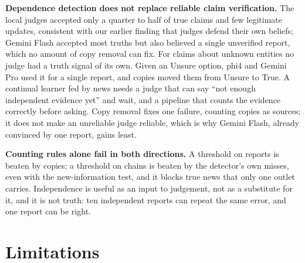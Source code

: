 \textbf{Dependence detection does not replace reliable claim verification.} The local judges accepted only a quarter to half of true claims and few legitimate updates, consistent with our earlier finding that judges defend their own beliefs; Gemini Flash accepted most truths but also believed a single unverified report, which no amount of copy removal can fix. For claims about unknown entities no judge had a truth signal of its own. Given an Unsure option, phi4 and Gemini Pro used it for a single report, and copies moved them from Unsure to True. A continual learner fed by news needs a judge that can say ``not enough independent evidence yet'' and wait, and a pipeline that counts the evidence correctly before asking. Copy removal fixes one failure, counting copies as sources; it does not make an unreliable judge reliable, which is why Gemini Flash, already convinced by one report, gains least.

\textbf{Counting rules alone fail in both directions.} A threshold on reports is beaten by copies; a threshold on chains is beaten by the detector's own misses, even with the new-information test, and it blocks true news that only one outlet carries. Independence is useful as an input to judgement, not as a substitute for it, and it is not truth: ten independent reports can repeat the same error, and one report can be right.

\section{Limitations}\label{sec:limitations}

